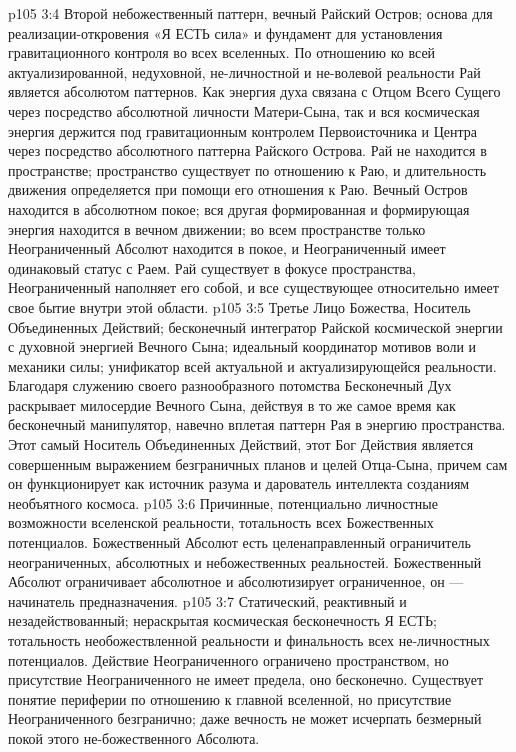 \vs p105 3:4 \bibnobreakspace {} Второй небожественный паттерн, вечный Райский Остров; основа для реализации\hyp{}откровения «Я ЕСТЬ сила» и фундамент для установления гравитационного контроля во всех вселенных. По отношению ко всей актуализированной, недуховной, не\hyp{}личностной и не\hyp{}волевой реальности Рай является абсолютом паттернов. Как энергия духа связана с Отцом Всего Сущего через посредство абсолютной личности Матери\hyp{}Сына, так и вся космическая энергия держится под гравитационным контролем Первоисточника и Центра через посредство абсолютного паттерна Райского Острова. Рай не находится в пространстве; пространство существует по отношению к Раю, и длительность движения определяется при помощи его отношения к Раю. Вечный Остров находится в абсолютном покое; вся другая формированная и формирующая энергия находится в вечном движении; во всем пространстве только Неограниченный Абсолют находится в покое, и Неограниченный имеет одинаковый статус с Раем. Рай существует в фокусе пространства, Неограниченный наполняет его собой, и все существующее относительно имеет свое бытие внутри этой области.
\vs p105 3:5 \pc {}\bibnobreakspace {} Третье Лицо Божества, Носитель Объединенных Действий; бесконечный интегратор Райской космической энергии с духовной энергией Вечного Сына; идеальный координатор мотивов воли и механики силы; унификатор всей актуальной и актуализирующейся реальности. Благодаря служению своего разнообразного потомства Бесконечный Дух раскрывает милосердие Вечного Сына, действуя в то же самое время как бесконечный манипулятор, навечно вплетая паттерн Рая в энергию пространства. Этот самый Носитель Объединенных Действий, этот Бог Действия является совершенным выражением безграничных планов и целей Отца\hyp{}Сына, причем сам он функционирует как источник разума и дарователь интеллекта созданиям необъятного космоса.
\vs p105 3:6 \pc {}\bibnobreakspace {} Причинные, потенциально личностные возможности вселенской реальности, тотальность всех Божественных потенциалов. Божественный Абсолют есть целенаправленный ограничитель неограниченных, абсолютных и небожественных реальностей. Божественный Абсолют ограничивает абсолютное и абсолютизирует ограниченное, он --- начинатель предназначения.
\vs p105 3:7 \pc {}\bibnobreakspace {} Статический, реактивный и незадействованный; нераскрытая космическая бесконечность Я ЕСТЬ; тотальность необожествленной реальности и финальность всех не\hyp{}личностных потенциалов. Действие Неограниченного ограничено пространством, но присутствие Неограниченного не имеет предела, оно бесконечно. Существует понятие периферии по отношению к главной вселенной, но присутствие Неограниченного безгранично; даже вечность не может исчерпать безмерный покой этого не\hyp{}божественного Абсолюта.
